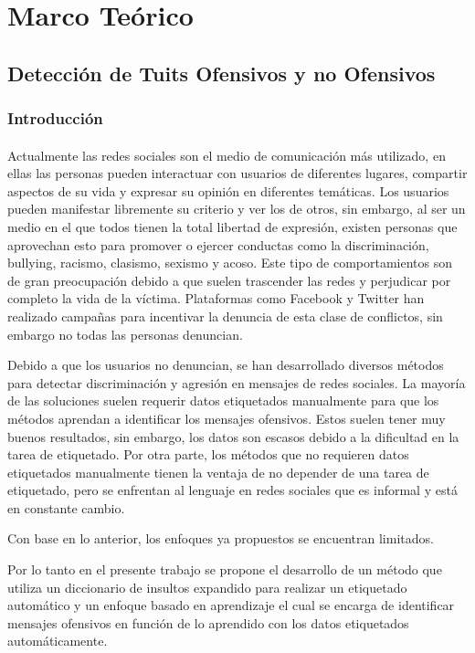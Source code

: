 \documentclass{article}
\begin{document}
\clearpage
\section{Marco Teórico}
\subsection{Detección de Tuits Ofensivos y no Ofensivos}

\subsubsection{Introducción}
\paragraph{}
Actualmente las redes sociales son el medio de comunicación más utilizado, en ellas las personas pueden interactuar con usuarios de diferentes lugares, compartir aspectos de su vida y expresar su opinión en diferentes temáticas. Los usuarios pueden manifestar libremente su criterio y ver los de otros, sin embargo, al ser un medio en el que todos tienen la total libertad de expresión, existen personas que aprovechan esto para promover o ejercer conductas como la discriminación, bullying, racismo, clasismo, sexismo y acoso. Este tipo de comportamientos son de gran preocupación debido a que suelen trascender las redes y perjudicar por completo la vida de la víctima. Plataformas como Facebook y Twitter han realizado campañas para incentivar la denuncia de esta clase de conflictos, sin embargo no todas las personas denuncian.

Debido a que los usuarios no denuncian, se han desarrollado diversos métodos para detectar discriminación y agresión en mensajes de redes sociales. La mayoría de las soluciones suelen requerir datos etiquetados manualmente para que los métodos aprendan a identificar los mensajes ofensivos. Estos suelen tener muy buenos resultados, sin embargo, los datos son escasos debido a la dificultad en la tarea de etiquetado. Por otra parte, los métodos que no requieren datos etiquetados manualmente tienen la ventaja de no depender de una tarea de etiquetado, pero se enfrentan al lenguaje en redes sociales que es informal y está en constante cambio.

Con base en lo anterior, los enfoques ya propuestos se encuentran limitados.

Por lo tanto en el presente trabajo se propone el desarrollo de un método que utiliza un diccionario de insultos expandido para realizar un etiquetado automático y un enfoque basado en aprendizaje el cual se encarga de identificar mensajes ofensivos en función de lo aprendido con los datos etiquetados automáticamente.
\end{document}
